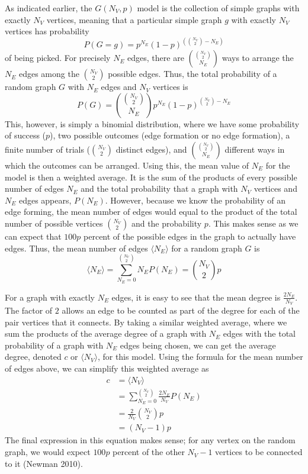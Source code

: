 \documentclass[12pt,twoside]{amherstthesis}
\begin{document}
  As indicated earlier, the \(G(N_V, p)\) model is the collection of
  simple graphs with exactly \(N_{V}\) vertices, meaning that a particular
  simple graph \(g\) with exactly \(N_V\) vertices has probability
  \[P(G = g) = p^{N_E}(1 - p)^{\left({N_V \choose 2} - N_E \right)}\] of
  being picked. For precisely \(N_E\) edges, there are
  \({{N_{V} \choose 2} \choose N_{E}}\) ways to arrange the \(N_{E}\)
  edges among the \({N_V \choose 2}\) possible edges. Thus, the total
  probability of a random graph \(G\) with \(N_{E}\) edges and \(N_{V}\)
  vertices is
  \[P(G) = {{N_{V} \choose 2} \choose N_{E}}p^{N_E}(1 - p)^{{N_V \choose 2} - N_E}\]
  This, however, is simply a binomial distribution, where we have some
  probability of success (\(p\)), two possible outcomes (edge formation or
  no edge formation), a finite number of trials (\({N_{V} \choose 2}\)
  distinct edges), and \({{N_{V} \choose 2} \choose N_{E}}\) different
  ways in which the outcomes can be arranged. Using this, the mean value
  of \(N_E\) for the model is then a weighted average. It is the sum of
  the products of every possible number of edges \(N_E\) and the total
  probability that a graph with \(N_{V}\) vertices and \(N_{E}\) edges
  appears, \(P(N_{E})\). However, because we know the probability of an
  edge forming, the mean number of edges would equal to the product of the
  total number of possible vertices \({N_{V} \choose 2}\) and the
  probability \(p\). This makes sense as we can expect that \(100p\)
  percent of the possible edges in the graph to actually have edges. Thus,
  the mean number of edges \(\langle N_{E} \rangle\) for a random graph
  \(G\) is
  \[ \langle N_{E} \rangle = \sum_{N_{E}=0}^{{N_{V} \choose 2}} N_{E}P(N_{E}) = {N_{V} \choose 2}p\]
  
  For a graph with exactly \(N_{E}\) edges, it is easy to see that the
  mean degree is \(\frac {2N_{E}} {N_{V}}\). The factor of \(2\) allows an
  edge to be counted as part of the degree for each of the pair vertices
  that it connects. By taking a similar weighted average, where we sum the
  products of the average degree of a graph with \(N_E\) edges with the
  total probability of a graph with \(N_E\) edges being chosen, we can get
  the average degree, denoted \(c\) or \(\langle N_{V} \rangle\), for this
  model. Using the formula for the mean number of edges above, we can
  simplify this weighted average as \[
  \begin{aligned}
  c &= \langle N_{V} \rangle \\
  &= \sum_{N_{E}=0}^{{N_{V} \choose 2}} \frac {2N_{E}} {N_{V}} P(N_{E}) \\
  &= \frac {2} {N_{V}} {N_{V} \choose 2}p \\
  &= (N_{V} - 1)p
  \end{aligned}
  \] The final expression in this equation makes sense; for any vertex on
  the random graph, we would expect \(100p\) percent of the other
  \(N_{V} - 1\) vertices to be connected to it (Newman 2010).
  
\end{document}
